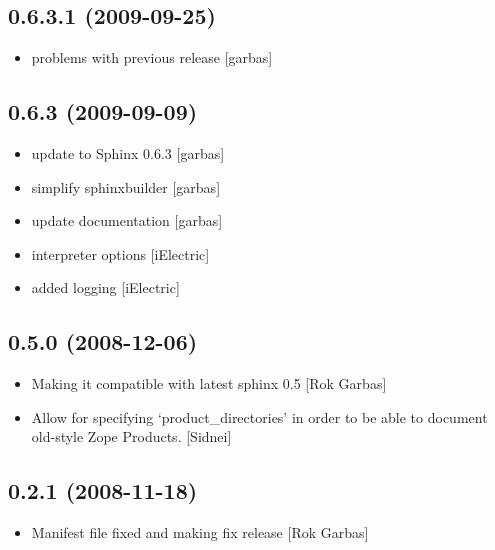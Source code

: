 \documentclass[letterpaper,10pt,english]{sphinxmanual}
\begin{document}
\subsection{0.6.3.1 (2009-09-25)}
\label{history:id11}\begin{itemize}
\item {} 
problems with previous release {[}garbas{]}

\end{itemize}


\subsection{0.6.3 (2009-09-09)}
\label{history:id12}\begin{itemize}
\item {} 
update to Sphinx 0.6.3 {[}garbas{]}

\item {} 
simplify sphinxbuilder {[}garbas{]}

\item {} 
update documentation {[}garbas{]}

\item {} 
interpreter options {[}iElectric{]}

\item {} 
added logging {[}iElectric{]}

\end{itemize}


\subsection{0.5.0 (2008-12-06)}
\label{history:id13}\begin{itemize}
\item {} 
Making it compatible with latest sphinx 0.5 {[}Rok Garbas{]}

\item {} 
Allow for specifying `product\_directories' in order to be able to
document old-style Zope Products. {[}Sidnei{]}

\end{itemize}


\subsection{0.2.1 (2008-11-18)}
\label{history:id14}\begin{itemize}
\item {} 
Manifest file fixed and making fix release {[}Rok Garbas{]}

\end{itemize}
\end{document}
